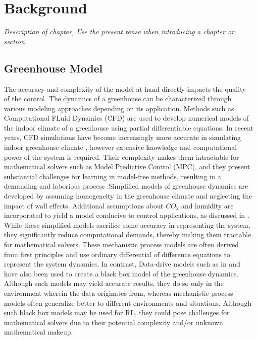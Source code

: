 \chapter{Background}
\label{chapter:Background}

\emph{Description of chapter, Use the present tense when introducing a chapter or section}

\section{Greenhouse Model}
\label{section:greenhouse-model}

The accuracy and complexity of the model at hand directly impacts the quality of the control.  The dynamics of a greenhouse can be characterized through various modeling approaches depending on its application. Methods such as Computational FLuid Dynamics (CFD) are used to develop numerical models of the indoor climate of a greenhouse using partial differentiable equations. In recent years, CFD simulations have become increasingly more accurate in simulating indoor greenhouse climate \cite{delatorre-geaComputationalFluidDynamics2011}, however extensive knowledge and computational power of the system is required.
Their complexity makes them intractable for mathematical solvers such as Model Predictive Control (MPC), and they present substantial challenges for learning in model-free methods, resulting in a demanding and laborious process \cite{jansenOptimalControlLettuce2023}.Simplified models of greenhouse dynamics are developed by assuming homogeneity in the greenhouse climate and neglecting the impact of wall effects. Additional assumptions about $CO_2$ and humidity are incorporated to yield a model conducive to  control applications, as discussed in \cite{jansenOptimalControlLettuce2023, lopez-cruzDevelopmentAnalysisDynamical2018}. While these simplified models sacrifice some accuracy in representing the system, they significantly reduce computational demands, thereby making them tractable for mathematical solvers. These mechanistic process models are often derived from first principles and use ordinary differential of difference equations to represent the system dynamics.
In contrast, Data-drive models such as in \cite{gongDeepLearningBased2021} and \cite{maestriniMixingProcessbasedDatadriven2022} have also been used to create a black box model of the greenhouse dynamics. Although such models may yield accurate results, they do so only in the environment wherein the data originates from, whereas mechanistic process models often generalize better to different environments and situations. Although such black box models may be used for RL, they could pose challenges for mathematical solvers due to their potential complexity and/or unknown mathematical makeup.
